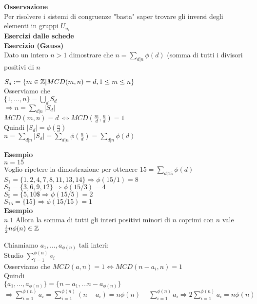 \documentclass[12px]{article}
\begin{document}
	\textbf{Osservazione}\\
	Per risolvere i sistemi di congruenze "basta" saper trovare gli inversi degli elementi in gruppi $U_{n_i}$\\
	 \textbf{Esercizi dalle schede}\\
	 \textbf{Esercizio (Gauss)}\\
	 Dato un intero $n > 1$ dimostrare che  $n = \sum_{d | n} \phi (d)$ (somma di tutti i divisori positivi di $n$
\begin{dimo}
	$S_d : = \{m\in \mathbb{Z} | MCD(m,n) = d, 1 \leq m\leq n\}$\\
	Osserviamo che \\
	$\{1,\ldots,n\} = \bigcup_dS_d$\\
	 $ \Rightarrow  n= \sum_{d | n} | S_d|$\\
 $MCD(m,n) = d \ \Leftrightarrow MCD(\frac md, \frac nd) = 1$\\
 Quindi $|S_d| = \phi(\frac nd)$\\
 $n = \sum_{d|n}|S_d| = \sum_{d|n}\phi(\frac nd) = \sum_{d|n}\phi(d)$\\
\end{dimo}
 \textbf{Esempio}\\
 $n = 15$\\
 Voglio ripetere la dimostrazione per ottenere  $15 = \sum_{d|15}\phi(d)$\\
 $S_1 = \{1,2, 4, 7, 8, 11, 13 , 14\} \Rightarrow \phi(15/1) = 8$\\
 $S_3 = \{3, 6, 9, 12\} \Rightarrow \phi(15/3) = 4$\\
 $S_5 = \{5, 10\$ \Rightarrow \phi(15/5) = 2$\\
	 $S_{15} = \{15\} \Rightarrow \phi ( 15/15) = 1$\\
\textbf{Esempio}\\
$n.1$ Allora la somma di tutti gli interi positivi minori di $n$ coprimi con $n$ vale $\frac 12n\phi(n)\in \mathbb{Z}$
\begin{dimo}
	Chiamiamo $a_1,\ldots, a_{\phi(n)}$ tali interi:\\
	Studio $\sum_{i=1}^{\phi(n)}a_i$\\
	Osserviamo che  $MCD(a,n)=1 \Leftrightarrow MCD(n-a_i, n) = 1$ \\
	Quindi\\
	$\{a_1,\ldots, a_{\phi(n)}\} = \{n - a_1,\ldots n - a_{\phi(n)}\}$\\
	$ \Rightarrow \sum^{\phi(n)}_{i=1}a_i = \sum^{\phi(n)}_{i=1}(n-a_i) = n\phi(n) - \sum^{\phi(n)}_{i=1}a_i \Rightarrow 2 \sum^{\phi(n)}_{i=1}a_i = n \phi(n)$
\end{dimo}
\end{document}
